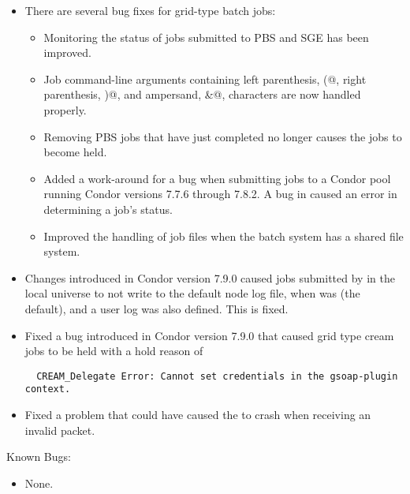 \begin{itemize}
\item There are several bug fixes for grid-type batch jobs:
  \begin{itemize}
  \item Monitoring the status of jobs submitted to PBS and SGE has been
    improved.   
  \item Job command-line arguments containing 
    left parenthesis, \verb@(@, right parenthesis, \verb@)@, 
    and ampersand, \verb@&@, characters are now handled properly. 
  \item Removing PBS jobs that have just completed no longer causes the jobs
    to become held. 
  \item Added a work-around for a bug when submitting jobs to
    a Condor pool running Condor versions 7.7.6 through 7.8.2.
    A bug in   caused an error in determining
    a job's status.
  \item Improved the handling of job files when the batch system has a shared
    file system. 
  \end{itemize}

\item Changes introduced in Condor version 7.9.0 caused jobs submitted by
 in the local universe to not write to the default node log file,
when  was  (the default),
and a user log was also defined. This is fixed. 

\item Fixed a bug introduced in Condor version 7.9.0 that caused grid type
cream jobs to be held with a hold reason of 
\footnotesize
\begin{verbatim}
  CREAM_Delegate Error: Cannot set credentials in the gsoap-plugin context.
\end{verbatim}
\normalsize
{}

\item Fixed a problem that could have caused the  to crash
when receiving an invalid packet.

\end{itemize}

\noindent Known Bugs:

\begin{itemize}

\item None.

\end{itemize}

